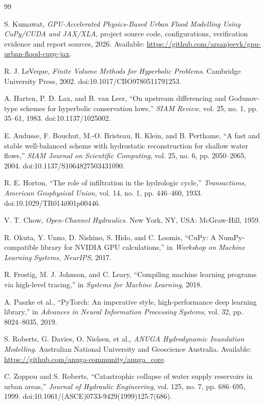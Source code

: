 \documentclass[11pt,a4paper,oneside]{report}
\begin{document}
\begin{thebibliography}{99}

S. Kumawat, \emph{GPU-Accelerated Physics-Based Urban Flood Modelling Using
CuPy/CUDA and JAX/XLA}, project source code, configurations, verification evidence and
report sources, 2026. Available:
\url{https://github.com/arsanjeevk/gpu-urban-flood-cupy-jax}.

R. J. LeVeque, \emph{Finite Volume Methods for Hyperbolic Problems}.
Cambridge University Press, 2002. doi:10.1017/CBO9780511791253.

A. Harten, P. D. Lax, and B. van Leer, ``On upstream differencing and
Godunov-type schemes for hyperbolic conservation laws,'' \emph{SIAM Review},
vol. 25, no. 1, pp. 35--61, 1983. doi:10.1137/1025002.

E. Audusse, F. Bouchut, M.-O. Bristeau, R. Klein, and B. Perthame,
``A fast and stable well-balanced scheme with hydrostatic reconstruction for
shallow water flows,'' \emph{SIAM Journal on Scientific Computing}, vol. 25,
no. 6, pp. 2050--2065, 2004. doi:10.1137/S1064827503431090.

R. E. Horton, ``The role of infiltration in the hydrologic cycle,''
\emph{Transactions, American Geophysical Union}, vol. 14, no. 1,
pp. 446--460, 1933. doi:10.1029/TR014i001p00446.

V. T. Chow, \emph{Open-Channel Hydraulics}. New York, NY, USA:
McGraw-Hill, 1959.

R. Okuta, Y. Unno, D. Nishino, S. Hido, and C. Loomis, ``CuPy: A
NumPy-compatible library for NVIDIA GPU calculations,'' in \emph{Workshop on
Machine Learning Systems, NeurIPS}, 2017.

R. Frostig, M. J. Johnson, and C. Leary, ``Compiling machine learning
programs via high-level tracing,'' in \emph{Systems for Machine Learning}, 2018.

A. Paszke et al., ``PyTorch: An imperative style, high-performance deep
learning library,'' in \emph{Advances in Neural Information Processing
Systems}, vol. 32, pp. 8024--8035, 2019.

S. Roberts, G. Davies, O. Nielsen, et al., \emph{ANUGA Hydrodynamic
Inundation Modelling}. Australian National University and Geoscience
Australia. Available: \url{https://github.com/anuga-community/anuga_core}.

C. Zoppou and S. Roberts, ``Catastrophic collapse of water supply reservoirs
in urban areas,'' \emph{Journal of Hydraulic Engineering}, vol. 125, no. 7,
pp. 686--695, 1999. doi:10.1061/(ASCE)0733-9429(1999)125:7(686).

\end{thebibliography}
\end{document}
